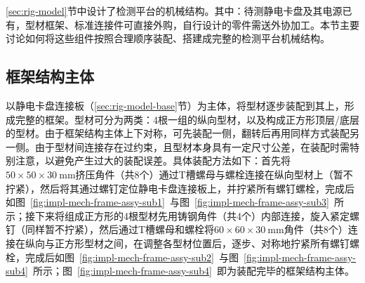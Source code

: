 \ref{sec:rig-model}节中设计了检测平台的机械结构。其中：待测静电卡盘及其电源已有，型材框架、标准连接件可直接外购，自行设计的零件需送外协加工。本节主要讨论如何将这些组件按照合理顺序装配、搭建成完整的检测平台机械结构。


\subsection{框架结构主体}\label{sec:impl-mech-frame}

以静电卡盘连接板（\ref{sec:rig-model-base}节）为主体，将型材逐步装配到其上，形成完整的框架。型材可分为两类：4根一组的纵向型材，以及构成正方形顶层/底层的型材。由于框架结构主体上下对称，可先装配一侧，翻转后再用同样方式装配另一侧。由于型材间连接存在过约束，且型材本身具有一定尺寸公差，在装配时需特别注意，以避免产生过大的装配误差。具体装配方法如下：首先将$\num{50}\times\num{50}\times\SI{30}{\mm}$挤压角件（共8个）通过T槽螺母与螺栓连接在纵向型材上（暂不拧紧），然后将其通过螺钉定位静电卡盘连接板上，并拧紧所有螺钉螺栓，完成后如图~\ref{fig:impl-mech-frame-assy-sub1}~与图~\ref{fig:impl-mech-frame-assy-sub3}~所示；接下来将组成正方形的4根型材先用铸钢角件（共4个）内部连接，旋入紧定螺钉（同样暂不拧紧），然后通过T槽螺母和螺栓将$\num{60}\times\num{60}\times\SI{30}{\mm}$角件（共8个）连接在纵向与正方形型材之间，在调整各型材位置后，逐步、对称地拧紧所有螺钉螺栓，完成后如图~\ref{fig:impl-mech-frame-assy-sub2}~与图~\ref{fig:impl-mech-frame-assy-sub4}~所示；图~\ref{fig:impl-mech-frame-assy-sub4}~即为装配完毕的框架结构主体。

